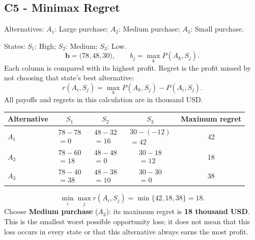 \subsection*{C5 - Minimax Regret }
\label{sol:flower-stall-c5}
Alternatives: $A_1$: Large purchase; $A_2$: Medium purchase; $A_3$: Small purchase.\par
States: $S_1$: High; $S_2$: Medium; $S_3$: Low.
\[\boldsymbol{b}=\bigl(78,48,30\bigr),\qquad b_j=\max_k P(A_k,S_j).\]
Each column is compared with its highest profit. Regret is the profit missed by not choosing that state's best alternative:
\[r(A_i,S_j)=\max_k P(A_k,S_j)-P(A_i,S_j).\]
All payoffs and regrets in this calculation are in thousand USD.
\begin{center}
\begin{tabular}{@{}lcccc@{}}\toprule
Alternative & $S_1$ & $S_2$ & $S_3$ & Maximum regret\\\midrule
$A_1$ & $\begin{gathered}78-78\\=0\end{gathered}$ & $\begin{gathered}48-32\\=16\end{gathered}$ & $\begin{gathered}30-(-12)\\=42\end{gathered}$ & 42\\
$A_2$ & $\begin{gathered}78-60\\=18\end{gathered}$ & $\begin{gathered}48-48\\=0\end{gathered}$ & $\begin{gathered}30-18\\=12\end{gathered}$ & 18\\
$A_3$ & $\begin{gathered}78-40\\=38\end{gathered}$ & $\begin{gathered}48-38\\=10\end{gathered}$ & $\begin{gathered}30-30\\=0\end{gathered}$ & 38\\
\bottomrule\end{tabular}
\end{center}
\[\min_i\max_j r(A_i,S_j)=\min\{42,18,38\}=18.\]
Choose \textbf{Medium purchase} ($A_2$): its maximum regret is \textbf{18 thousand USD}. This is the smallest worst possible opportunity loss; it does not mean that this loss occurs in every state or that this alternative always earns the most profit.

